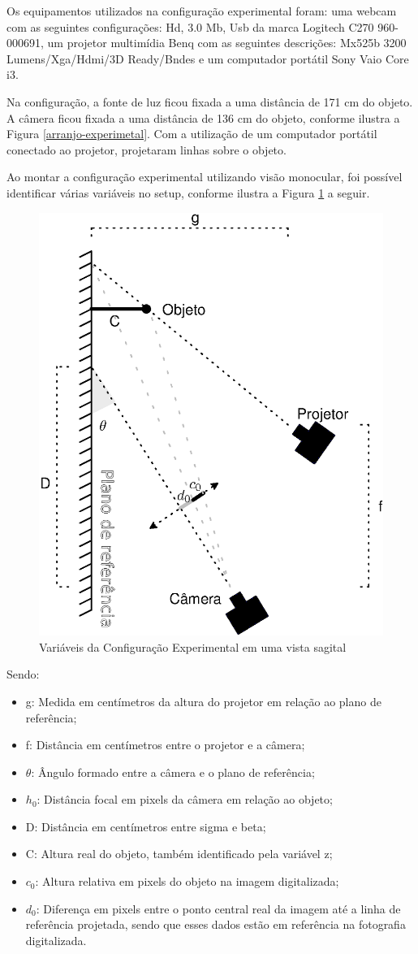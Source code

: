 \documentclass[a4paper, 12pt]{article}
\begin{document}
Os equipamentos utilizados na configuração experimental foram: uma webcam com as seguintes configurações: Hd, 3.0 Mb, Usb da marca Logitech C270 960-000691, um projetor multimídia Benq com as seguintes descrições: Mx525b 3200 Lumens/Xga/Hdmi/3D Ready/Bndes e um computador portátil Sony Vaio Core i3. 

Na configuração, a fonte de luz ficou fixada a uma distância de 171 cm do objeto. A câmera ficou fixada a uma distância de 136 cm do objeto, conforme ilustra a Figura \ref{arranjo-experimetal}.  Com a utilização de um computador portátil conectado ao projetor, projetaram linhas sobre o objeto.

Ao montar a configuração experimental utilizando visão monocular, foi possível identificar várias variáveis no setup, conforme ilustra a Figura \ref{setup com as variaveis} a seguir.

\begin{figure}[h!]
	\centering
		\includegraphics[width=.55\linewidth]{vista_sagital.eps}
	\caption{Variáveis da Configuração Experimental em uma vista sagital}
	\label{setup com as variaveis}
\end{figure}

Sendo:

\begin{itemize}
\item g: Medida em centímetros da altura do projetor em relação ao plano de referência;
\item f:  Distância em centímetros entre o projetor e a câmera;	          
\item $\theta$: Ângulo formado entre a câmera e o plano de referência;
\item $h_0$: Distância focal em pixels da câmera em relação ao objeto;  
\item D:  Distância em centímetros entre sigma e beta;
\item C: Altura real do objeto, também identificado pela variável z;
\item $c_0$: Altura relativa em pixels do objeto na imagem digitalizada;
\item $d_0$: Diferença em pixels entre o ponto central real da imagem até a linha de referência projetada, sendo que esses dados estão em referência na fotografia digitalizada. 
\end{itemize} 
 
\end{document}
